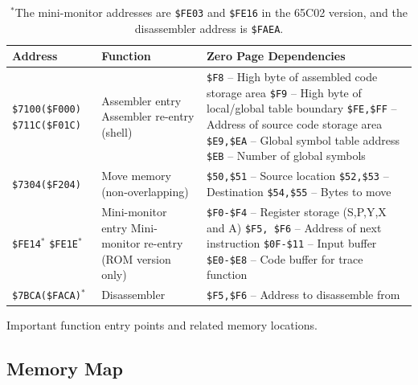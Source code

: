 \documentclass[12pt]{article}
\begin{document}
\begin{table}[htb]
	\centering
	\begin{tabular}{|p{2.8cm}|p{4.7cm}|p{8.5cm}|}
		\hline
		\textbf{Address} & \textbf{Function} & \textbf{Zero Page Dependencies} \\
		\hline
		\texttt{\$7100(\$F000)} \newline
		\texttt{\$711C(\$F01C)} & 
		\raggedright Assembler entry Assembler re-entry (shell) & 
		\texttt{\$F8} -- High byte of assembled code storage area \newline
		\texttt{\$F9} -- High byte of local/global table boundary \newline
		\texttt{\$FE,\$FF} -- Address of source code storage area \newline
		\texttt{\$E9,\$EA} -- Global symbol table address \newline
		\texttt{\$EB} -- Number of global symbols \\
		\hline
		\texttt{\$7304(\$F204)} & 
		\raggedright Move memory (non\hbox{-}overlapping) & 
		\texttt{\$50,\$51} -- Source location \newline
		\texttt{\$52,\$53} -- Destination \newline
		\texttt{\$54,\$55} -- Bytes to move \\
		\hline
		\texttt{\$FE14}\ensuremath{^{*}} \newline
		\texttt{\$FE1E}\ensuremath{^{*}} & 
		\raggedright Mini-monitor entry \newline
		Mini-monitor re-entry (ROM version only) & 
		\texttt{\$F0-\$F4} -- Register storage (S,P,Y,X and A) \newline
		\texttt{\$F5, \$F6} -- Address of next instruction \newline
		\texttt{\$0F-\$11} -- Input buffer \newline
		\texttt{\$E0-\$E8} -- Code buffer for trace function \\
		\hline
		\texttt{\$7BCA(\$FACA)}\ensuremath{^{*}} & 
		Disassembler & 
		\texttt{\$F5,\$F6} -- Address to disassemble from \\
		\hline
	\end{tabular}
	\caption{Important function entry points and related memory locations.}
	\caption*{\ensuremath{^{*}}The mini-monitor addresses are \texttt{\$FE03} and \texttt{\$FE16} in the 65C02 version, and the disassembler address is \texttt{\$FAEA}.}
	\label{tab:entrypoints}
\end{table}

\subsection{Memory Map}
\label{sec:memory}
\end{document}
